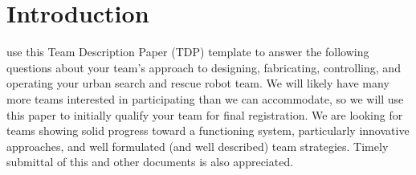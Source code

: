 \documentclass[journal]{IEEEtran}
\begin{document}
%
\IEEEpeerreviewmaketitle





\section{Introduction}
% 
% 
% 
% 

 use this Team Description Paper (TDP) template to answer the following questions about your team's approach to designing, fabricating, controlling, and operating your urban search and rescue robot team. We will likely have many more teams interested in participating than we can accommodate, so we will use this paper to initially qualify your team for final registration. We are looking for teams showing solid progress toward a functioning system, particularly innovative approaches, and well formulated (and well described) team strategies.  Timely submittal of this and other documents is also appreciated.
\end{document}

